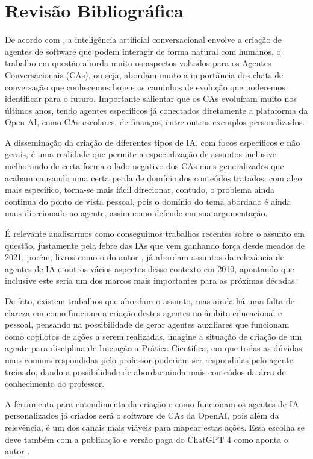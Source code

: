 \documentclass{article}
\begin{document}
\section{Revisão Bibliográfica}

\hspace{0.5cm}De acordo com \cite{Mariani2023}, a inteligência artificial conversacional envolve a criação de agentes de software que podem interagir de forma natural com humanos, o trabalho em questão aborda muito os aspectos voltados para os Agentes Conversacionais (CAs), ou seja, abordam muito a importância dos chats de conversação que conhecemos hoje e os caminhos de evolução que poderemos identificar para o futuro. Importante salientar que os CAs evoluíram muito nos últimos anos, tendo agentes específicos já conectados diretamente a plataforma da Open AI, como CAs escolares, de finanças, entre outros exemplos personalizados.

A disseminação da criação de diferentes tipos de IA, com focos específicos e não gerais, é uma realidade que permite a especialização de assuntos inclusive melhorando de certa forma o lado negativo dos CAs mais generalizados que acabam causando uma certa perda de domínio dos conteúdos tratados, com algo mais específico, torna-se mais fácil direcionar, contudo, o problema ainda continua do ponto de vista pessoal, pois o domínio do tema abordado é ainda mais direcionado ao agente, assim como \cite{Sampaio2024} defende em sua argumentação.

É relevante analisarmos como conseguimos trabalhos recentes sobre o assunto em questão, justamente pela febre das IAs que vem ganhando força desde meados de 2021, porém, livros como o do autor \cite{Teahan2010}, já abordam assuntos da relevância de agentes de IA e outros vários aspectos desse contexto em 2010, apontando que inclusive este seria um dos marcos mais importantes para as próximas décadas.

De fato, existem trabalhos que abordam o assunto, mas ainda há uma falta de clareza em como funciona a criação destes agentes no âmbito educacional e pessoal, pensando na possibilidade de gerar agentes auxiliares que funcionam como copilotos de ações a serem realizadas, imagine a situação de criação de um agente para disciplina de Iniciação a Prática Científica, em que todas as dúvidas mais comuns respondidas pelo professor poderiam ser respondidas pelo agente treinado, dando a possibilidade de abordar ainda mais conteúdos da área de conhecimento do professor.

A ferramenta para entendimenta da criação e como funcionam os agentes de IA personalizados já criados será o software de CAs da  OpenAI, pois além da relevência, é um dos canais mais viáveis para mapear estas ações. Essa escolha se deve também com a publicação e versão paga do ChatGPT 4 como aponta o autor \cite{Sampaio2024}.
\end{document}
